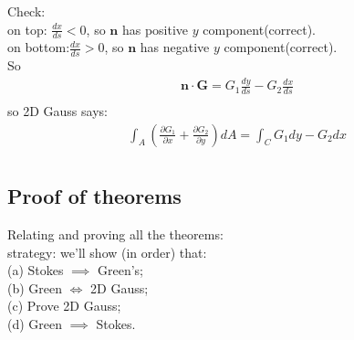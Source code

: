 \documentclass[a4paper]{article}
\begin{document}
\begin{thm}
Check:\\
on top: $\frac{dx}{ds}<0$, so $\mathbf{n}$ has positive $y$ component(correct).\\
on bottom:$\frac{dx}{ds}>0$, so $\mathbf{n}$ has negative $y$ component(correct).\\
So\\
\begin{equation*}
\begin{aligned}
\mathbf{n}\cdot\mathbf{G}=G_{1}\frac{dy}{ds}-G_{2}\frac{dx}{ds}\\
\end{aligned}
\end{equation*}
so 2D Gauss says:
\begin{equation*}
\begin{aligned}
\int_{A} \left(\frac{\partial G_{1}}{\partial x}+\frac{\partial G_{2}}{\partial y}\right) dA = \int_{C} G_{1} dy - G_{2} dx\\
\end{aligned}
\end{equation*}
\end{thm}

\subsection{Proof of theorems}
Relating and proving all the theorems:\\
strategy: we'll show (in order) that:\\
(a) Stokes $\implies$ Green's;\\
(b) Green $\iff$ 2D Gauss;\\
(c) Prove 2D Gauss;\\
(d) Green $\implies$ Stokes.\\
\end{document}

